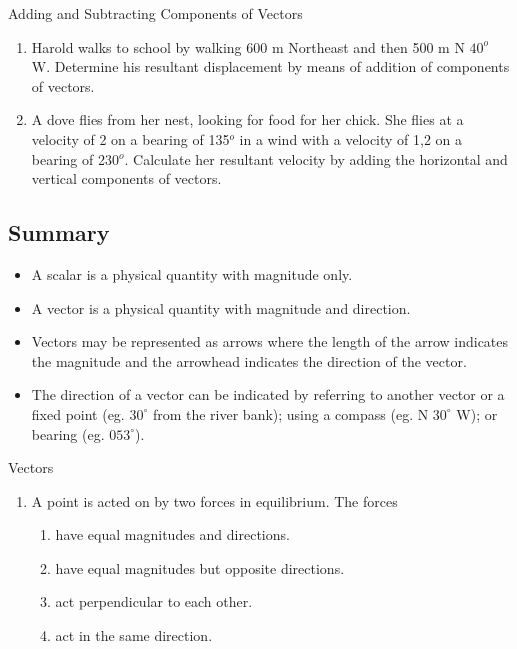 \begin{exercises}{Adding and Subtracting Components of Vectors}{
\begin{enumerate}[noitemsep, label=\textbf{\arabic*}.]
\item Harold walks to school by walking 600 m Northeast and then 500 m N $40^o$ W. Determine his resultant displacement by means of addition of components of vectors.
\item A dove flies from her nest, looking for food for her chick. She flies at a velocity of 2 \ms on a bearing of 135${^o}$ in a wind with a velocity of 1,2 \ms on a bearing of 230${^o}$. Calculate her resultant velocity by adding the horizontal and vertical components of vectors.
\end{enumerate}
}

\subsection*{Summary}
\begin{itemize}
\item A scalar is a physical quantity with magnitude only.
\item A vector is a physical quantity with magnitude and direction.
\item Vectors may be represented as arrows where the length of the arrow indicates the magnitude and the arrowhead indicates the direction of the vector.
\item The direction of a vector can be indicated by referring to another vector or a fixed point (eg. $30^{\circ}$ from the river bank); using a compass (eg. N $30^\circ$ W); or bearing (eg. $053 ^\circ$).
\end{itemize}
\begin{eocexercises}{Vectors}\noindent
\begin{enumerate}[noitemsep, label=\textbf{\arabic*}.]
          \label{m38819*uid92}\item A point is acted on by two forces in equilibrium. The forces
\label{m38819*id197705}\begin{enumerate}[noitemsep, label=\textbf{\alph*}. ] 
            \label{m38819*uid93}\item have equal magnitudes and directions.
\label{m38819*uid94}\item have equal magnitudes but opposite directions.
\label{m38819*uid95}\item act perpendicular to each other.
\label{m38819*uid96}\item act in the same direction.

\end{enumerate}
\end{enumerate}
\end{eocexercises}
\end{exercises}
